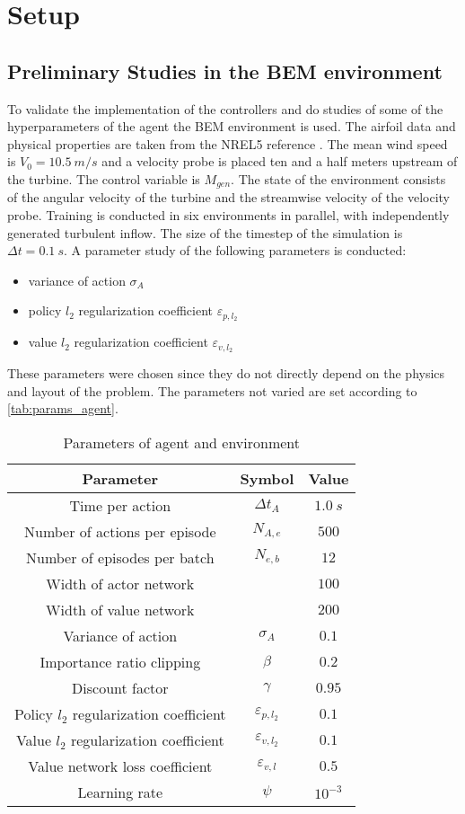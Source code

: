 \section{Setup}
\subsection{Preliminary Studies in the BEM environment}
To validate the implementation of the controllers and do studies of some of the hyperparameters of the agent the BEM environment is used. The airfoil data and physical properties are taken from the NREL5 reference \cite{jonkman_definition_2009}. The mean wind speed is $V_0=\SI{10.5}{m/s}$ and a velocity probe is placed ten and a half meters upstream of the turbine.
The control variable is $M_{gen}$. The state of the environment consists of the angular velocity of the turbine and the streamwise velocity of the velocity probe. Training is conducted in six environments in parallel, with independently generated turbulent inflow. The size of the timestep of the simulation is $\Delta t = \SI{0.1}{s}$.
A parameter study of the following parameters is conducted:
\begin{itemize}
	\item variance of action $\sigma_A$
	\item policy $l_2$ regularization coefficient $\varepsilon_{p,l_2}$
	\item value $l_2$ regularization coefficient $\varepsilon_{v,l_2}$
\end{itemize}
These parameters were chosen since they do not directly depend on the physics and layout of the problem. The parameters not varied are set according to \autoref{tab:params_agent}.
\begin{table}[h]
	\centering
	\caption{Parameters of agent and environment}
	\begin{tabular}{ccc}
		\toprule
		Parameter & Symbol & Value \\
		\midrule
		Time per action & $\Delta t_A$ & $\SI{1.0}{s}$ \\ 
		Number of actions per episode & $N_{A,e}$ & $500$ \\
		Number of episodes per batch & $N_{e,b}$ & $12$ \\
		Width of actor network & & $100$ \\ 
		Width of value network & & $200$ \\ 
		Variance of action & $\sigma_A$ & $0.1$ \\ 
		Importance ratio clipping & $\beta$ & $0.2$ \\ 
		Discount factor & $\gamma$ & $0.95$ \\ 
		Policy $l_2$ regularization coefficient & $\varepsilon_{p,l_2} $ & $0.1$ \\ 
		Value $l_2$ regularization coefficient & $\varepsilon_{v,l_2}$ & $0.1$ \\ 
		Value network loss coefficient & $\varepsilon_{v,l}$ & $0.5$ \\ 
		Learning rate & $\psi$ & $10^{-3}$ \\
		\bottomrule
	\end{tabular}
	\label{tab:params_agent}
\end{table}
